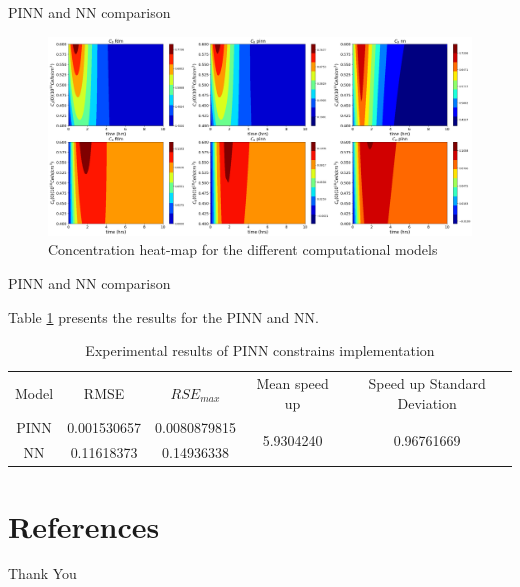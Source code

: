 \documentclass[serif,8pt, aspectratio=169]{beamer}
\begin{document}
\begin{frame}[fragile]{PINN and NN comparison}
    \begin{figure}
        \centering
        \includegraphics[width=0.95\linewidth]{pic/conc_heat_plot.png}
        \caption{Concentration heat-map for the different computational models}
        \label{fig:enter-label}
    \end{figure}
\end{frame}

\begin{frame}[fragile]{PINN and NN comparison}

    Table \ref{tab:results} presents the results for the PINN and NN.
    
        \begin{table}[htb!]
        \centering
        \caption{Experimental results of PINN constrains implementation}
        \label{tab:results}
        \begin{tabular}{ccccc}
        \cline{1-5}
        Model & RMSE        & $RSE_{max}$ & Mean speed up              & Speed up Standard Deviation \\ \cline{1-5}
        PINN  & 0.001530657 & 0.0080879815   & \multirow{2}{*}{5.9304240} & \multirow{2}{*}{0.96761669} \\
        NN    & 0.11618373   & 0.14936338     &                            &                            
        \end{tabular}
        \end{table}

\end{frame}

\section{References}

\begin{frame}[allowframebreaks]
    
    
\end{frame}


\begin{frame}
    \begin{center}
        {\Huge\calligra Thank You}
    \end{center}
\end{frame}
\end{document}
